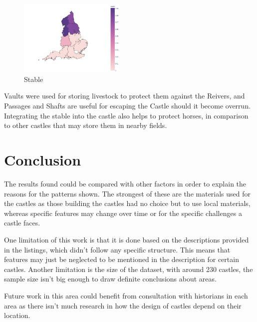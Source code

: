 \documentclass[11pt]{article}
\begin{document}
\begin{figure}[H]
	\centering
	\includegraphics[width=0.45\textwidth]{stable.png}
	\caption{Stable}
\end{figure}

Vaults were used for storing livestock to protect them against the Reivers, and Passages and Shafts are useful for escaping the Castle should it become overrun. Integrating the stable into the castle also helps to protect horses, in comparison to other castles that may store them in nearby fields.

\section{Conclusion}

The results found could be compared with other factors in order to explain the reasons for the patterns shown. The strongest of these are the materials used for the castles as those building the castles had no choice but to use local materials, whereas specific features may change over time or for the specific challenges a castle faces.

One limitation of this work is that it is done based on the descriptions provided in the listings, which didn't follow any specific structure. This means that features may just be neglected to be mentioned in the description for certain castles. Another limitation is the size of the dataset, with around 230 castles, the sample size isn't big enough to draw definite conclusions about areas.

Future work in this area could benefit from consultation with historians in each area as there isn't much research in how the design of castles depend on their location.



\newpage
\printbibliography
\end{document}
